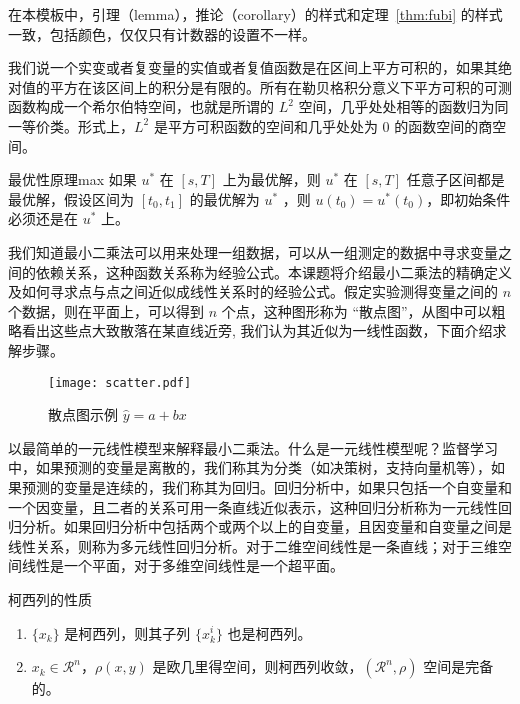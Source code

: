 	\begin{note}
	在本模板中，引理（lemma），推论（corollary）的样式和定理~\ref{thm:fubi} 的样式一致，包括颜色，仅仅只有计数器的设置不一样。
	\end{note}
	
	我们说一个实变或者复变量的实值或者复值函数是在区间上平方可积的，如果其绝对值的平方在该区间上的积分是有限的。所有在勒贝格积分意义下平方可积的可测函数构成一个希尔伯特空间，也就是所谓的 $L^2$ 空间，几乎处处相等的函数归为同一等价类。形式上，$L^2$ 是平方可积函数的空间和几乎处处为 0 的函数空间的商空间。
	
	\begin{proposition}{最优性原理}{max}
	如果 $u^*$ 在 $[s,T]$ 上为最优解，则 $u^*$ 在 $[s, T]$ 任意子区间都是最优解，假设区间为 $[t_0, t_1]$ 的最优解为 $u^*$ ，则 $u(t_0)=u^{*}(t_0)$，即初始条件必须还是在 $u^*$ 上。
	\end{proposition}
	
	我们知道最小二乘法可以用来处理一组数据，可以从一组测定的数据中寻求变量之间的依赖关系，这种函数关系称为经验公式。本课题将介绍最小二乘法的精确定义及如何寻求点与点之间近似成线性关系时的经验公式。假定实验测得变量之间的 $n$ 个数据，则在平面上，可以得到 $n$ 个点，这种图形称为 “散点图”，从图中可以粗略看出这些点大致散落在某直线近旁, 我们认为其近似为一线性函数，下面介绍求解步骤。
	
	\begin{figure}[htbp]
		\centering
		\texttt{[image: scatter.pdf]}
		\caption{散点图示例 $\hat{y}=a+bx$ \label{fig:scatter}}
	\end{figure}
	
	以最简单的一元线性模型来解释最小二乘法。什么是一元线性模型呢？监督学习中，如果预测的变量是离散的，我们称其为分类（如决策树，支持向量机等），如果预测的变量是连续的，我们称其为回归。回归分析中，如果只包括一个自变量和一个因变量，且二者的关系可用一条直线近似表示，这种回归分析称为一元线性回归分析。如果回归分析中包括两个或两个以上的自变量，且因变量和自变量之间是线性关系，则称为多元线性回归分析。对于二维空间线性是一条直线；对于三维空间线性是一个平面，对于多维空间线性是一个超平面。
	
	\begin{property}\label{property:cauchy}
	柯西列的性质
	\begin{enumerate}
	\item $\{x_k\}$ 是柯西列，则其子列 $\{x_k^i\}$ 也是柯西列。
	\item $x_k\in \mathcal{R}^n$，$\rho(x,y)$ 是欧几里得空间，则柯西列收敛，$(\mathcal{R}^n,\rho)$ 空间是完备的。
	\end{enumerate}
	\end{property}
	
